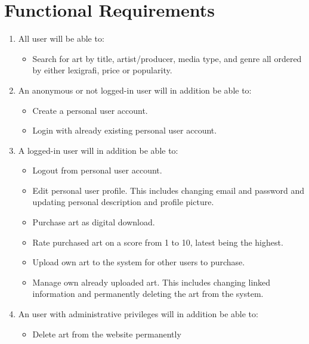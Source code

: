 \documentclass[../report.tex]{subfiles}
\begin{document}
\section{Functional Requirements}

\begin{enumerate}


\item All user will be able to: 
	\begin{itemize}
		\item Search for art by title, artist/producer, media type, and genre all ordered by either lexigrafi, price or popularity.
	\end{itemize}

\item An anonymous or not logged-in user will in addition be able to:
	\begin{itemize}
		\item Create a personal user account.
		\item Login with already existing  personal user account.
	\end{itemize}
	
\item A logged-in user will in addition be able to:
	\begin{itemize}
		\item Logout from personal user account.
		\item Edit personal user profile. This includes changing email and password and updating personal description and profile picture.
		\item Purchase art as digital download.
		\item Rate purchased art on a score from 1 to 10, latest being the highest.
		\item Upload own art to the system for other users to purchase.
		\item Manage own already uploaded art. This includes changing linked information and permanently deleting the art from the system.
	\end{itemize}

\item An user with administrative privileges will in addition be able to:
	\begin{itemize} 
	\item Delete art from the website permanently
	\end{itemize}
	
\end{enumerate}
\end{document}
